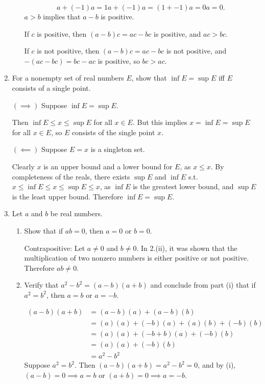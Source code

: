 \documentclass[a4paper,10pt]{book}
\theoremstyle{plain} %
\begin{document}
\begin{enumerate}
\begin{enumerate}[label=(\roman*),align=left]
		\[a+(-1)a = 1a+(-1)a = (1+-1)a = 0a = 0.\]		
		$a>b$ implies that $a-b$ is positive.\par
		If $c$ is positive, then $(a-b)c = ac-bc$ is positive, and $ac>bc$.\par
		If $c$ is not positive, then $(a-b)c = ac-bc$ is not positive, and $-(ac-bc) = bc-ac$ is positive, so $bc>ac$.\par
    \end{enumerate}
	\item For a nonempty set of real numbers $E$, show that $\inf E = \sup E$ iff $E$ consists of a single point.\par
	$(\implies)$ Suppose $\inf E = \sup E$.\par
	Then $\inf E \le x \le \sup E$ for all $x\in E$. But this implies $x = \inf E = \sup E$ for all $x\in E$, so $E$ consists of the single point $x$.\par
	$(\impliedby)$ Suppose $E={x}$ is a singleton set.\par
	Clearly $x$ is an upper bound and a lower bound for $E$, as $x\le x$. 
	By completeness of the reals, there exists $\sup E$ and $\inf E$ s.t. $x \le \inf E \le x \le \sup E \le x$, as $\inf E$ is the greatest lower bound, and $\sup E$ is the least upper bound.
	Therefore $\inf E = \sup E$.
	\item Let $a$ and $b$ be real numbers.
	\begin{enumerate}[label=(\roman*),align=left]
        \item Show that if $ab = 0$, then $a=0$ or $b=0$.\par
        Contrapositive: Let $a\neq0$ and $b\neq0$. In 2.(ii), it was shown that the multiplication of two nonzero numbers is either positive or not positive. Therefore $ab\neq 0$.
        \item Verify that $a^2 -b^2 = (a-b)(a+b)$ and conclude from part (i) that if $a^2 = b^2$, then $a=b$ or $a=-b$.\par
        \begin{align*}
			(a-b)(a+b) & = (a-b)(a) + (a-b)(b) && \tag*{by distributive property}\\
			& = (a)(a)+(-b)(a) + (a)(b)+(-b)(b) && \tag*{by distributive property}\\
			& = (a)(a)+(-b+b)(a) +(-b)(b) && \tag*{by distributive property}\\
			& = (a)(a) +(-b)(b) && \tag*{by additive inverse}\\
			& = a^2 - b^2 
		\end{align*}
		Suppose $a^2=b^2$. Then $(a-b)(a+b)=a^2-b^2=0$, and by (i), $(a-b)=0 \implies a=b$ or $(a+b)=0 \implies a=-b$.

\end{enumerate}
\end{enumerate}
\end{document}
